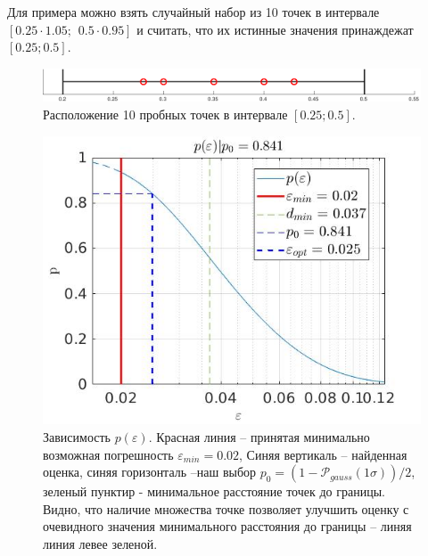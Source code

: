 \documentclass[a4paper,12pt]{article} %
\begin{document}
Для примера можно взять случайный набор из 10 точек в интервале $[0.25 \cdot 1.05; \hspace{5pt} 0.5 \cdot 0.95]$ и считать, что их истинные значения принаждежат $[0.25; 0.5]$.

\newpage

\begin{figure}[h!]
\begin{center}
\includegraphics[width=1\textwidth]{./pics/rand_line}
\end{center}
\caption{Расположение 10 пробных точек в интервале $[0.25; 0.5]$.} \label{img:rand_line}
\end{figure}

\begin{figure}[h!]
\begin{center}
\includegraphics[width=1\textwidth]{./pics/vis}
\end{center}
\caption{Зависимость $p(\varepsilon)$. Красная линия -- принятая минимально возможная погрешность $\varepsilon_{min} = 0.02$, Синяя вертикаль -- найденная оценка, синяя горизонталь --наш выбор $p_0 = (1 - \mathcal{P}_{gauss}(1\sigma))/2$, зеленый пунктир - минимальное расстояние точек до границы. Видно, что наличие множества точке позволяет улучшить оценку с очевидного значения минимального расстояния до границы -- линяя линия левее зеленой.} \label{img:vis}
\end{figure}
\end{document}
